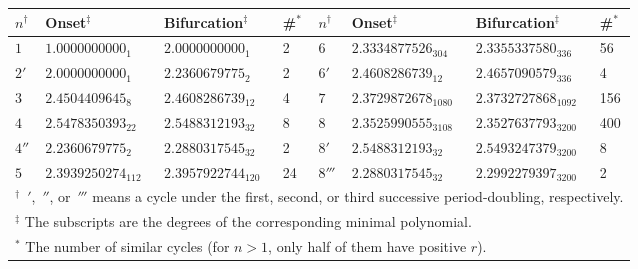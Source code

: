 \documentclass{ws-ijbc}
\begin{document}
\begin{table}[h]\footnotesize

{
\begin{tabular}{l l l l l l l l}
\hline
  $n^\dagger$
& Onset$^\ddagger$
& Bifurcation$^\ddagger$
& \#$^*$
&
  $n^\dagger$
& Onset$^\ddagger$
& Bifurcation$^\ddagger$
& \#$^*$ \\
\hline
$1$     & $1.0000000000_1$      &  $2.0000000000_1$       & 2   &
$6$     & $2.3334877526_{304}$  &  $2.3355337580_{336}$   & 56  \\
$2'$    & $2.0000000000_1$      &  $2.2360679775_2$       & 2   &
$6'$    & $2.4608286739_{12}$   &  $2.4657090579_{336}$   & 4   \\
$3$     & $2.4504409645_{8}$    &  $2.4608286739_{12}$    & 4   &
$7$     & $2.3729872678_{1080}$ &  $2.3732727868_{1092}$  & 156 \\
$4$     & $2.5478350393_{22}$   &  $2.5488312193_{32}$    & 8   &
$8$     & $2.3525990555_{3108}$ &  $2.3527637793_{3200}$  & 400 \\
$4''$   & $2.2360679775_{2}$    &  $2.2880317545_{32}$    & 2   &
$8'$    & $2.5488312193_{32}$   &  $2.5493247379_{3200}$  & 8   \\
$5$     & $2.3939250274_{112}$  &  $2.3957922744_{120}$   & 24  &
$8'''$  & $2.2880317545_{32}$   &  $2.2992279397_{3200}$  & 2   \\
\hline
\multicolumn{8}{p{\textwidth}}{
$^\dagger$
  $\,'$, $\,''$, or $\,'''$ means
    a cycle under
    the first, second, or third successive period-doubling, respectively.
} \\
\multicolumn{8}{l}{
$^\ddagger$
  The subscripts are the degrees of the corresponding minimal polynomial.
} \\
\multicolumn{8}{l}{
$^*$
  The number of similar cycles
    (for $n > 1$, only half of them have positive $r$).
} \\
\hline
\end{tabular}
\label{tab:crval}
}
\end{table}
\end{document}
